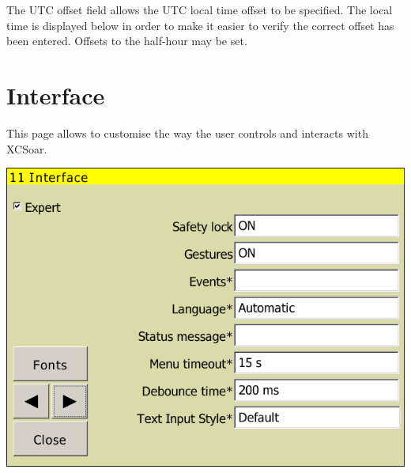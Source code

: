 The UTC offset field allows the UTC local time offset to be specified.
The local time is displayed below in order to make it easier to verify
the correct offset has been entered.  Offsets to the half-hour may be
set.



\clearpage
\section{Interface}\label{sec:interface}

This page allows to customise the way the user controls and interacts with
XCSoar.

\begin{center}
\includegraphics[angle=0,width=0.8\linewidth,keepaspectratio='true']{figures/config-interface.png}
\end{center}

